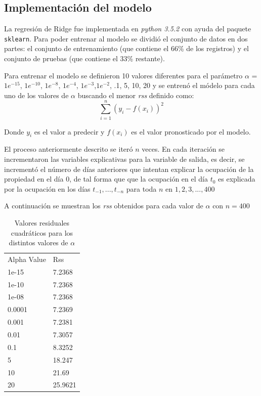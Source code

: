 \subsection*{Implementación del modelo}

La regresión de Ridge fue implementada en \emph{python 3.5.2} con ayuda del paquete \texttt{sklearn}. Para poder entrenar al modelo se dividió el conjunto de datos en dos partes: el conjunto de entrenamiento (que contiene el 66\% de los registros) y el conjunto de pruebas (que contiene el 33\% restante). 

Para entrenar el modelo se definieron 10 valores diferentes para el parámetro $\alpha$ = $1e^{-15}$, $1e^{-10}$, $1e^{-8}$, $1e^{-4}$, $1e^{-3}$,$1e^{-2}$, .1, 5, 10, 20 y se entrenó el módelo para cada uno de los valores de $\alpha$ buscando el menor \emph{rss} definido como: $$\sum_{i=1}^{n}(y_i - f(x_i))^2$$

Donde $y_i$ es el valor a predecir y $f(x_i)$ es el valor pronosticado por el modelo.

El proceso anteriormente descrito se iteró $n$ veces. En cada iteración se incrementaron las variables explicativas para la variable de salida, es decir, se incrementó el número de días anteriores que intentan explicar la ocupación de la propiedad en el día 0, de tal forma que que la ocupación en el día $t_0$ es explicada por la ocupación en los días $t_{-1},...,t_{-n}$ para toda $n$ en ${1,2,3,...,400}$

A continuación se muestran los \emph{rss} obtenidos para cada valor de $\alpha$ con $n = 400$

\begin{table}[]
\centering
\begin{tabular}{ll}
Alpha Value & Rss    \\
1e-15       & 7.2368 \\
1e-10       & 7.2368 \\
1e-08       & 7.2368 \\
0.0001      & 7.2369 \\
0.001       & 7.2381 \\
0.01        & 7.3057 \\
0.1         & 8.3252 \\
5           & 18.247 \\
10          & 21.69  \\
20          & 25.9621
\end{tabular}
\caption{Valores residuales cuadráticos para los distintos valores de $\alpha$}
\end{table}

